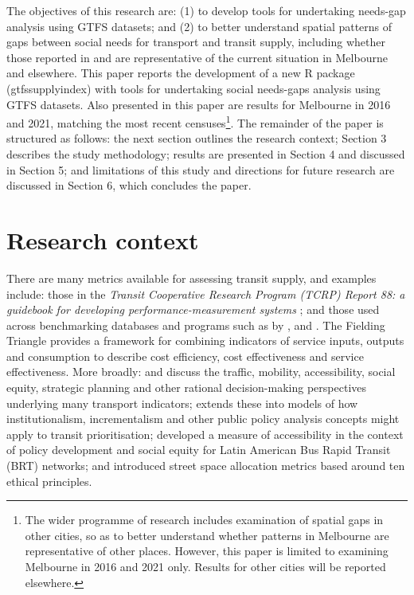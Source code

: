 \documentclass[preprint, 3p,
authoryear]{elsarticle} %
\begin{document}
The objectives of this research are: (1) to develop tools for
undertaking needs-gap analysis using GTFS datasets; and (2) to better
understand spatial patterns of gaps between social needs for transport
and transit supply, including whether those reported in
\citet{Currie2007Identifying} and \citet{currie2010identifying} are
representative of the current situation in Melbourne and elsewhere. This
paper reports the development of a new R package (gtfssupplyindex) with
tools for undertaking social needs-gaps analysis using GTFS datasets.
Also presented in this paper are results for Melbourne in 2016 and 2021,
matching the most recent censuses\footnote{The wider programme of
  research includes examination of spatial gaps in other cities, so as
  to better understand whether patterns in Melbourne are representative
  of other places. However, this paper is limited to examining Melbourne
  in 2016 and 2021 only. Results for other cities will be reported
  elsewhere.}. The remainder of the paper is structured as follows: the
next section outlines the research context; Section 3 describes the
study methodology; results are presented in Section 4 and discussed in
Section 5; and limitations of this study and directions for future
research are discussed in Section 6, which concludes the paper.

\section{Research context}\label{research-context}

There are many metrics available for assessing transit supply, and
examples include: those in the \emph{Transit Cooperative Research
Program (TCRP) Report 88: a guidebook for developing
performance-measurement systems} \citep{Ryus:2003aa}; and those used
across benchmarking databases and programs such as by
\citet{Florida-Transit-Information-System:2018aa}, \citet{UITP:2015aa}
and \citet{Imperial-College-London:2023aa}. The Fielding Triangle
\citep{FieldingGordonJ1987Mpts} provides a framework for combining
indicators of service inputs, outputs and consumption to describe cost
efficiency, cost effectiveness and service effectiveness. More broadly:
\citet{Litman:2003ab} and \citet{Litman:2016aa} discuss the traffic,
mobility, accessibility, social equity, strategic planning and other
rational decision-making perspectives underlying many transport
indicators; \citet{Reynolds:2017ah} extends these into models of how
institutionalism, incrementalism and other public policy analysis
concepts might apply to transit prioritisation;
\citet{GuzmanLuisA.2017Aeit} developed a measure of accessibility in the
context of policy development and social equity for Latin American Bus
Rapid Transit (BRT) networks; and
\citet{Creutzig2020streetspaceallocation} introduced street space
allocation metrics based around ten ethical principles.
\end{document}
